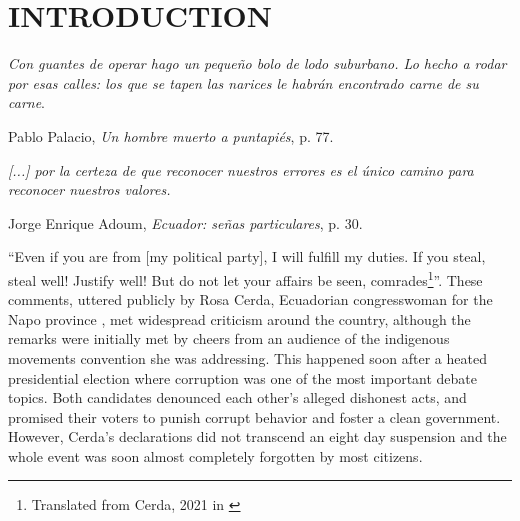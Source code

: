 \documentclass[floatsintext,man]{apa7}\usepackage[]{graphicx}\usepackage[]{color}
\begin{document}


\setlength{\epigraphwidth}{4.25in}

\section{INTRODUCTION}

\epigraph{\textit{Con guantes de operar hago un pequeño bolo de lodo suburbano. Lo hecho a rodar por esas calles: los que se tapen las narices le habrán encontrado carne de su carne}.}{Pablo Palacio, \textit{Un hombre muerto a puntapiés}, p. 77.} \nocite{Palacio.2018}
\vspace*{-1.5cm}
\epigraph{\textit{[...] por la certeza de que reconocer nuestros errores es el único camino para reconocer nuestros valores.}}{Jorge Enrique Adoum, \textit{Ecuador: señas particulares}, p. 30.}

\enquote{Even if you are from [my political party], I will fulfill my duties. If you steal, steal well!  Justify well! But do not let your affairs be seen, comrades\footnote{Translated from Cerda, 2021 in \cite[para. 2]{PlanV.2021}}}. These comments, uttered publicly by Rosa Cerda, Ecuadorian congresswoman for the Napo province \parencite{Castro.2021}, met widespread criticism around the country, although the remarks were initially met by cheers from an audience of the indigenous movements convention she was addressing. This happened soon after a heated presidential election where corruption was one of the most important debate topics. Both candidates denounced each other's alleged dishonest acts, and promised their voters to punish corrupt behavior and foster a clean government. However, Cerda's declarations did not transcend an eight day suspension \parencite{Ordonez.2021} and the whole event was soon almost completely forgotten by most citizens. 
\end{document}

